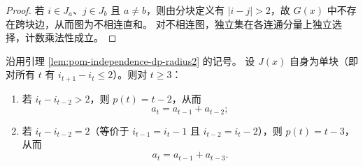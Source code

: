 \begin{proof}
若 $i\in J_a$、$j\in J_b$ 且 $a\neq b$，则由分块定义有 $|i-j|>2$，故 $G(x)$ 中不存在跨块边，从而图为不相连直和。
对不相连图，独立集在各连通分量上独立选择，计数乘法性成立。
\end{proof}

\begin{lemma}[单块情形的局部递推：\texorpdfstring{$a_t=a_{t-1}+a_{t-2}$}{a=a+a} 与 \texorpdfstring{$a_t=a_{t-1}+a_{t-3}$}{a=a+a} 的分岔]\label{lem:pom-ind-local-recurrence}
沿用引理 \ref{lem:pom-independence-dp-radius2} 的记号。
设 $J(x)$ 自身为单块（即对所有 $t$ 有 $i_{t+1}-i_t\le 2$）。则对 $t\ge 3$：
\begin{enumerate}
  \item 若 $i_t-i_{t-2}>2$，则 $p(t)=t-2$，从而
  \[
  a_t=a_{t-1}+a_{t-2};
  \]
  \item 若 $i_t-i_{t-2}=2$（等价于 $i_{t-1}=i_t-1$ 且 $i_{t-2}=i_t-2$），则 $p(t)=t-3$，从而
  \[
  a_t=a_{t-1}+a_{t-3}.
  \]
\end{enumerate}
\end{lemma}

